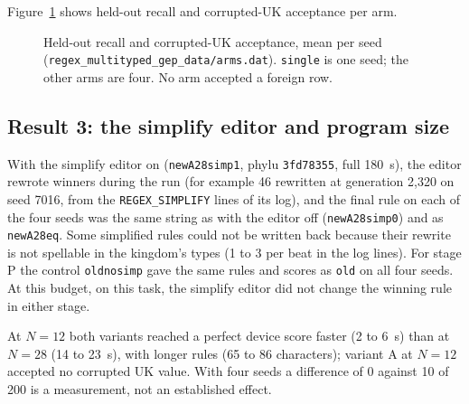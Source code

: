\documentclass[sigconf,nonacm]{acmart}
\newcommand{\src}[1]{{\small\nolinkurl{#1}}}
\begin{document}
Figure~\ref{fig:bars} shows held-out recall and corrupted-UK acceptance per arm.

\begin{figure}[t]
\centering
{}
\caption{Held-out recall and corrupted-UK acceptance, mean per seed
(\src{regex_multityped_gep_data/arms.dat}). \texttt{single} is one seed; the
other arms are four. No arm accepted a foreign row.}
\label{fig:bars}
\end{figure}

\subsection{Result 3: the simplify editor and program size}

With the simplify editor on (\texttt{newA28simp1}, phylu \texttt{3fd78355},
full 180~s), the editor rewrote winners during the run (for example 46 rewritten
at generation 2{,}320 on seed 7016, from the \src{REGEX_SIMPLIFY} lines of its
log), and the final rule on each of the four seeds was the same string as with the
editor off (\texttt{newA28simp0}) and as \texttt{newA28eq}. Some simplified rules
could not be written back because their rewrite is not spellable in the kingdom's
types (1 to 3 per beat in the log lines). For stage P the control
\texttt{oldnosimp} gave the same rules and scores as \texttt{old} on all four
seeds. At this budget, on this task, the simplify editor did not change the
winning rule in either stage.

At $N=12$ both variants reached a perfect device score faster (2 to 6~s) than at
$N=28$ (14 to 23~s), with longer rules (65 to 86 characters); variant A at $N=12$
accepted no corrupted UK value. With four seeds a difference of 0 against 10 of
200 is a measurement, not an established effect.
\end{document}
